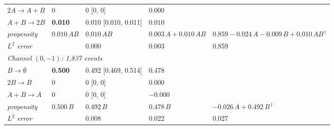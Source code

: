\begin{table}[htbp]
\begin{tabular}{l l l l l}
\quad $2A\to A+B$ & $0$ & 0 [0, 0] & $0.000$ &  \\
\quad $A+B\to 2B$ & \textbf{0.010} & 0.010 [0.010, 0.011] & $0.010$ &  \\
\qquad\quad \textit{propensity} & $0.010\,AB$ & $0.010\,AB$ & $0.003\,A + 0.010\,AB$ & $0.859 - 0.024\,A - 0.009\,B + 0.010\,AB{}^{\,\dagger}$ \\
\qquad\quad \textit{$L^2$ error} & & 0.000 & 0.003 & 0.859 \\
\midrule
\multicolumn{5}{l}{\textit{Channel $(0,-1)$: 1{,}837 events}} \\
\quad $B\to \emptyset$ & \textbf{0.500} & 0.492 [0.469, 0.514] & $0.478$ &  \\
\quad $2B\to B$ & $0$ & 0 [0, 0] & $0.000$ &  \\
\quad $A+B\to A$ & $0$ & 0 [0, 0] & $-0.000$ &  \\
\qquad\quad \textit{propensity} & $0.500\,B$ & $0.492\,B$ & $0.478\,B$ & $-0.026\,A + 0.492\,B{}^{\,\dagger}$ \\
\qquad\quad \textit{$L^2$ error} & & 0.008 & 0.022 & 0.027 \\
\bottomrule
\end{tabular}
\end{table}
